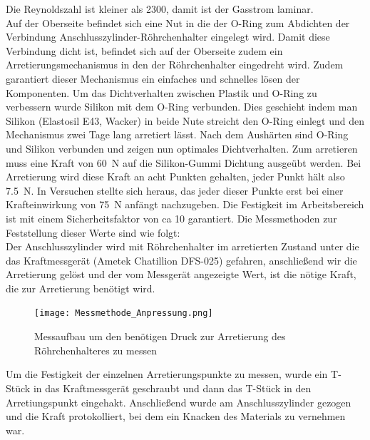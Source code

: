 Die Reynoldszahl ist kleiner als 2300, damit ist der Gasstrom laminar. \\
Auf der Oberseite befindet sich eine Nut in die der O-Ring zum Abdichten der Verbindung Anschlusszylinder-Röhrchenhalter eingelegt wird. Damit diese Verbindung dicht ist, befindet sich auf der Oberseite zudem ein Arretierungsmechanismus in den der Röhrchenhalter eingedreht wird. Zudem garantiert dieser Mechanismus ein einfaches und schnelles lösen der Komponenten. Um das Dichtverhalten zwischen Plastik und O-Ring zu verbessern wurde Silikon mit dem O-Ring verbunden. Dies geschieht indem man Silikon (Elastosil E43, Wacker) in beide Nute streicht den O-Ring einlegt und den Mechanismus zwei Tage lang arretiert lässt. Nach dem Aushärten sind O-Ring und Silikon verbunden und zeigen nun optimales Dichtverhalten. 
Zum arretieren muss eine Kraft von \SI{60}{N} auf die Silikon-Gummi Dichtung ausgeübt werden. Bei Arretierung wird diese Kraft an acht Punkten gehalten, jeder Punkt hält also \SI{7,5}{N}. In Versuchen stellte sich heraus, das jeder dieser Punkte erst bei einer Krafteinwirkung von \SI{75}{N} anfängt nachzugeben. Die Festigkeit im Arbeitsbereich ist mit einem Sicherheitsfaktor von ca 10 garantiert. Die Messmethoden zur Feststellung dieser Werte sind wie folgt: \hfill \\
Der Anschlusszylinder wird mit Röhrchenhalter im arretierten Zustand unter die das Kraftmessgerät (Ametek Chatillion DFS-025) gefahren, anschließend wir die Arretierung gelöst und der vom Messgerät angezeigte Wert, ist die nötige Kraft, die zur Arretierung benötigt wird. 

\begin{figure}[h]
	\begin{center}
		\texttt{[image: Messmethode\_Anpressung.png]}
		\caption[Messaufbau Arretierung 1]{Messaufbau um den benötigen Druck zur Arretierung des Röhrchenhalteres zu messen}
	\end{center}
\end{figure}

Um die Festigkeit der einzelnen Arretierungspunkte zu messen, wurde ein T-Stück in das Kraftmessgerät geschraubt und dann das T-Stück in den Arretiungspunkt eingehakt. Anschließend wurde am Anschlusszylinder gezogen und die Kraft protokolliert, bei dem ein Knacken des Materials zu vernehmen war.

